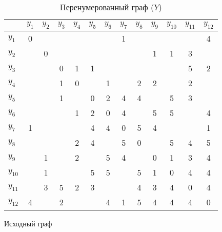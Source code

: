 \documentclass[a4paper,12pt]{article}
\begin{document}
    \begin{table}[H]
        \centering
        \caption{Перенумерованный граф ($Y$)}
        \begin{tabular}{l*{3}{|cccc}}
            &$y_{1}$&$y_{2}$&$y_{3}$&$y_{4}$&$y_{5}$&$y_{6}$&$y_{7}$&$y_{8}$&$y_{9}$&$y_{10}$&$y_{11}$&$y_{12}$\\
            \hline
            $y_{1}$&0&&&&&&1&&&&&4\\
            $y_{2}$&&0&&&&&&&1&1&3&\\
            $y_{3}$&&&0&1&1&&&&&&5&2\\
            $y_{4}$&&&1&0&&1&&2&2&&2&\\
            \hline
            $y_{5}$&&&1&&0&2&4&4&&5&3&\\
            $y_{6}$&&&&1&2&0&4&&5&5&&4\\
            $y_{7}$&1&&&&4&4&0&5&4&&&1\\
            $y_{8}$&&&&2&4&&5&0&&5&4&5\\
            \hline
            $y_{9}$&&1&&2&&5&4&&0&1&3&4\\
            $y_{10}$&&1&&&5&5&&5&1&0&4&4\\
            $y_{11}$&&3&5&2&3&&&4&3&4&0&4\\
            $y_{12}$&4&&2&&&4&1&5&4&4&4&0\\
        \end{tabular}
    \end{table}

    Исходный граф
\end{document}
